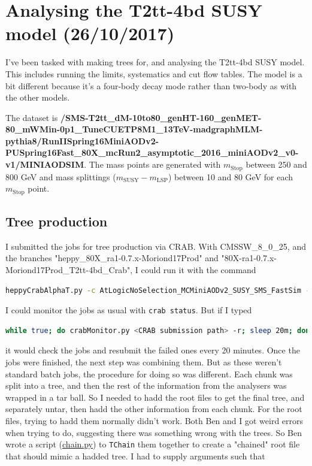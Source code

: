 
\chapter{Analysing the T2tt-4bd SUSY model (26/10/2017)}

I've been tasked with making trees for, and analysing the T2tt-4bd SUSY model. This includes running the limits, systematics and cut flow tables. The model is a bit different because it's a four-body decay mode rather than two-body as with the other models.

The dataset is \textbf{/SMS-T2tt\_dM-10to80\_genHT-160\_genMET-80\_mWMin-0p1\_TuneCUETP8M1\_13TeV-madgraphMLM-pythia8/RunIISpring16MiniAODv2-PUSpring16Fast\_80X\_mcRun2\_asymptotic\_2016\_miniAODv2\_v0-v1/MINIAODSIM}. The mass points are generated with $m_{\mathrm{Stop}}$ between 250 and 800 GeV and mass splittings ($m_{\mathrm{SUSY}} - m_{\mathrm{LSP}}$) between 10 and 80 GeV for each $m_{\mathrm{Stop}}$ point.


\section{Tree production}

I submitted the jobs for tree production via CRAB. With CMSSW\_8\_0\_25, and the branches "heppy\_80X\_ra1-0.7.x-Moriond17Prod" and "80X-ra1-0.7.x-Moriond17Prod\_T2tt-4bd\_Crab", I could run it with the command

\begin{lstlisting}[belowskip=-0.7cm, language=sh, numbers=none]
heppyCrabAlphaT.py -c AtLogicNoSelection_MCMiniAODv2_SUSY_SMS_FastSim -d RA1 -s T2_UK_SGrid_Bristol
\end{lstlisting}

I could monitor the jobs as usual with \texttt{crab status}. But if I typed

\begin{lstlisting}[belowskip=-0.7cm, language=sh, numbers=none]
while true; do crabMonitor.py <CRAB submission path> -r; sleep 20m; done
\end{lstlisting}

it would check the jobs and resubmit the failed ones every 20 minutes. Once the jobs were finished, the next step was combining them. But as these weren't standard batch jobs, the procedure for doing so was different. Each chunk was split into a tree, and then the rest of the information from the analysers was wrapped in a tar ball. So I needed to hadd the root files to get the final tree, and separately untar, then hadd the other information from each chunk. For the root files, trying to hadd them normally didn't work. Both Ben and I got weird errors when trying to do, suggesting there was something wrong with the trees. So Ben wrote a script (\href{run:sec31/chain.py}{chain.py}) to \texttt{TChain} them together to create a "chained" root file that should mimic a hadded tree. I had to supply arguments such that

